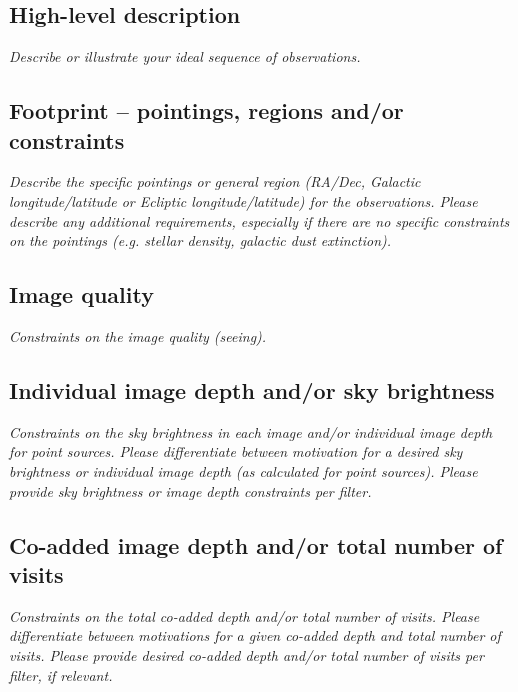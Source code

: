 \documentclass[11pt]{article}
\begin{document}
\subsection{High-level description}
\begin{footnotesize}
{\it Describe or illustrate your ideal sequence of observations.}
\end{footnotesize}

\vspace{.3in}

\subsection{Footprint -- pointings, regions and/or constraints}
\begin{footnotesize}{\it Describe the specific pointings or general region (RA/Dec, Galactic longitude/latitude or 
Ecliptic longitude/latitude) for the observations. Please describe any additional requirements, especially if there
are no specific constraints on the pointings (e.g. stellar density, galactic dust extinction).}
\end{footnotesize}

\subsection{Image quality}
\begin{footnotesize}{\it Constraints on the image quality (seeing).}\end{footnotesize}

\subsection{Individual image depth and/or sky brightness}
\begin{footnotesize}{\it Constraints on the sky brightness in each image and/or individual image depth for point sources.
Please differentiate between motivation for a desired sky brightness or individual image depth (as 
calculated for point sources). Please provide sky brightness or image depth constraints per filter.}
\end{footnotesize}

\subsection{Co-added image depth and/or total number of visits}
\begin{footnotesize}{\it  Constraints on the total co-added depth and/or total number of visits.
Please differentiate between motivations for a given co-added depth and total number of visits. 
Please provide desired co-added depth and/or total number of visits per filter, if relevant.}
\end{footnotesize}
\end{document}

